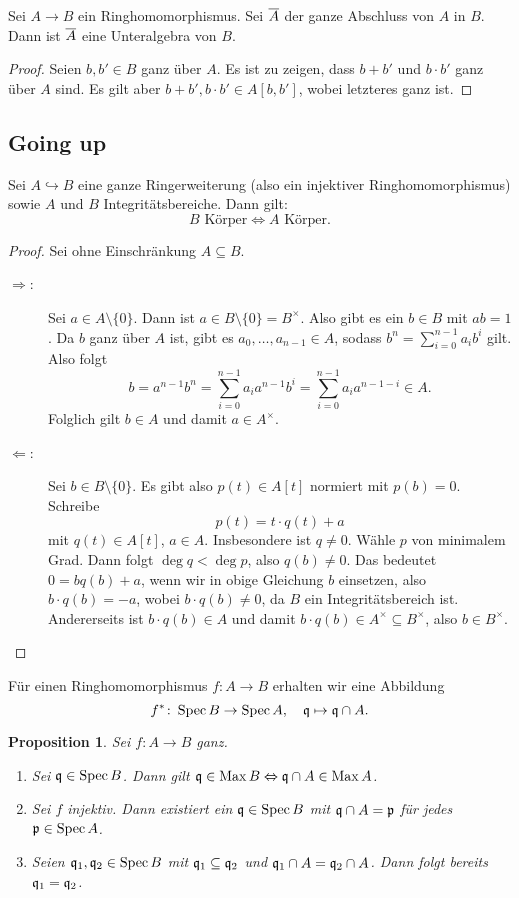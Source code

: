 \documentclass[12pt,a4paper]{scrartcl}
\theoremstyle{cplain}
\newtheorem{prop}[thmcounter]{Proposition}
\theoremstyle{cdef}
\begin{document}
\begin{kor}
	Sei $A\to B$ ein Ringhomomorphismus. Sei $\overline{A}$ der ganze Abschluss von $A$ in $B$. Dann ist $\overline{A}$ eine Unteralgebra von $B$.
\end{kor}
\begin{proof}
	Seien $b, b'\in B$ ganz über $A$. Es ist zu zeigen, dass $b+b'$ und $b\cdot b'$ ganz über $A$ sind. Es gilt aber $b+b', b\cdot b'\in A[b, b']$, wobei letzteres ganz ist.
\end{proof}

\subsection{Going up}
\begin{lem} \label{lem:6.7}
	Sei $A\hookrightarrow B$ eine ganze Ringerweiterung (also ein injektiver Ringhomomorphismus) sowie $A$ und $B$ Integritätsbereiche. Dann gilt: 
	\[B \text{ Körper}\Longleftrightarrow A\text{ Körper}.\]
\end{lem}
\begin{proof} Sei ohne Einschränkung $A\subseteq B$.
\begin{description}
	\item[\glqq$\Rightarrow$\grqq:] Sei $a\in A\setminus \{0\}$. Dann ist $a\in B\setminus\{0\} = B^{\times}$. Also gibt es ein $b\in B$ mit $ab = 1$. Da $b$ ganz über $A$ ist, gibt es $a_0,\dots, a_{n-1}\in A$, sodass $b^n = \sum_{i = 0}^{n-1}a_ib^i$ gilt. Also folgt
	\[ b = a^{n-1}b^n = \sum_{i = 0}^{n-1} a_ia^{n-1}b^i = \sum_{i = 0}^{n-1}a_ia^{n-1-i}\in A. \]
	Folglich gilt $b\in A$ und damit $a\in A^{\times}$.
	\item[\glqq$\Leftarrow$\grqq:] Sei $b\in B\setminus\{0\}$. Es gibt also $p(t) \in A[t]$ normiert mit $p(b) = 0$. Schreibe
	\[p(t) = t\cdot q(t) + a\]
	mit $q(t)\in A[t]$, $a\in A$. Insbesondere ist $q\neq 0$. Wähle $p$ von minimalem Grad. Dann folgt $\deg q < \deg p$, also $q(b) \neq 0$. Das bedeutet $0 = bq(b)+a$, wenn wir in obige Gleichung $b$ einsetzen, also $b\cdot q(b)  = -a$, wobei $b\cdot q(b) \neq 0$, da $B$ ein Integritätsbereich ist. Andererseits ist $b\cdot q(b) \in A$ und damit $b\cdot q(b) \in A^{\times}\subseteq B^{\times}$, also $b\in B^{\times}$.
	\qedhere
\end{description}	
\end{proof}
Für einen Ringhomomorphismus $f\colon A \to B$ erhalten wir eine Abbildung \[f^*\colon \operatorname{Spec} B\to \operatorname{Spec} A, \quad \mathfrak{q}\mapsto \mathfrak{q}\cap A.\]
\begin{prop} \label{prop:6.8}
	Sei $f\colon A \to B$ ganz.
	\begin{enumerate}
		\item Sei $\mathfrak{q}\in \operatorname{Spec} B$. Dann gilt $\mathfrak{q}\in \operatorname{Max} B \Leftrightarrow \mathfrak{q}\cap A\in \operatorname{Max} A$. \label{prop:6.8:i}
		\item Sei $f$ injektiv. Dann existiert ein $\mathfrak{q} \in \operatorname{Spec} B$ mit $\mathfrak{q}\cap A = \mathfrak{p}$ für jedes $\mathfrak{p} \in \operatorname{Spec} A$. \label{prop:6.8:ii}
		\item Seien $\mathfrak{q}_1,\mathfrak{q}_2\in\operatorname{Spec} B$ mit $\mathfrak{q}_1\subseteq \mathfrak{q}_2$ und $\mathfrak{q}_1\cap A = \mathfrak{q}_2\cap A$. Dann folgt bereits $\mathfrak{q}_1 = \mathfrak{q}_2$. \label{prop:6.8:iii}
	\end{enumerate}
\end{prop}
\end{document}
